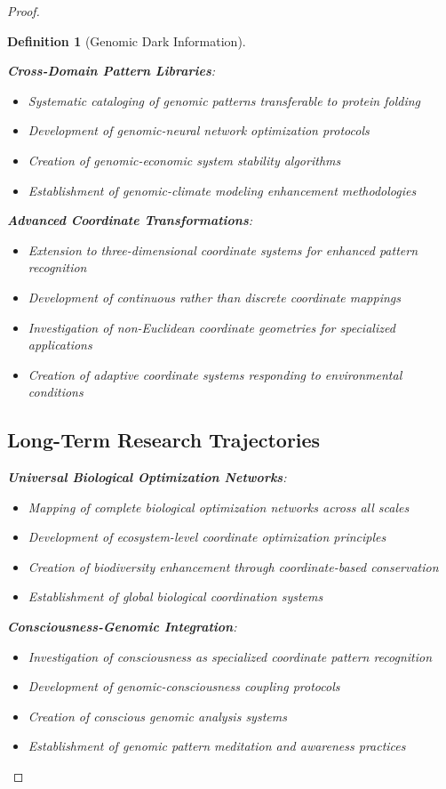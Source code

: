 \documentclass[12pt,a4paper]{article}
\newtheorem{definition}{Definition}
\begin{document}
\begin{proof}
\begin{definition}[Genomic Dark Information]
\begin{algorithm}[H]
\textbf{Cross-Domain Pattern Libraries}:
\begin{itemize}
\item Systematic cataloging of genomic patterns transferable to protein folding
\item Development of genomic-neural network optimization protocols
\item Creation of genomic-economic system stability algorithms
\item Establishment of genomic-climate modeling enhancement methodologies
\end{itemize}

\textbf{Advanced Coordinate Transformations}:
\begin{itemize}
\item Extension to three-dimensional coordinate systems for enhanced pattern recognition
\item Development of continuous rather than discrete coordinate mappings
\item Investigation of non-Euclidean coordinate geometries for specialized applications
\item Creation of adaptive coordinate systems responding to environmental conditions
\end{itemize}

\subsection{Long-Term Research Trajectories}

\textbf{Universal Biological Optimization Networks}:
\begin{itemize}
\item Mapping of complete biological optimization networks across all scales
\item Development of ecosystem-level coordinate optimization principles
\item Creation of biodiversity enhancement through coordinate-based conservation
\item Establishment of global biological coordination systems
\end{itemize}

\textbf{Consciousness-Genomic Integration}:
\begin{itemize}
\item Investigation of consciousness as specialized coordinate pattern recognition
\item Development of genomic-consciousness coupling protocols
\item Creation of conscious genomic analysis systems
\item Establishment of genomic pattern meditation and awareness practices
\end{itemize}


\end{algorithm}
\end{definition}
\end{proof}
\end{document}
